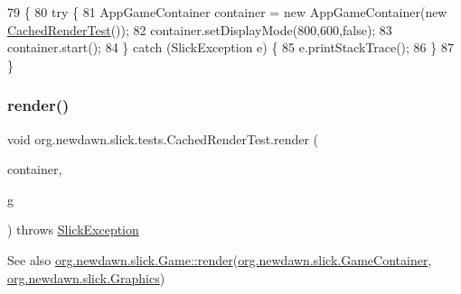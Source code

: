\begin{DoxyCode}
79                                            \{
80         \textcolor{keywordflow}{try} \{
81             AppGameContainer container = \textcolor{keyword}{new} AppGameContainer(\textcolor{keyword}{new} 
      \mbox{\hyperlink{classorg_1_1newdawn_1_1slick_1_1tests_1_1_cached_render_test_aec210751ba11df5b8061d362723f21f0}{CachedRenderTest}}());
82             container.setDisplayMode(800,600,\textcolor{keyword}{false});
83             container.start();
84         \} \textcolor{keywordflow}{catch} (SlickException e) \{
85             e.printStackTrace();
86         \}
87     \}
\end{DoxyCode}
\mbox{\label{classorg_1_1newdawn_1_1slick_1_1tests_1_1_cached_render_test_a9314cb710b62c992d698e1f15337f3d7}} 
\subsubsection{\texorpdfstring{render()}{render()}}
{\footnotesize\ttfamily void org.\+newdawn.\+slick.\+tests.\+Cached\+Render\+Test.\+render (\begin{DoxyParamCaption}\item[{\mbox{\hyperlink{classorg_1_1newdawn_1_1slick_1_1_game_container}{Game\+Container}}}]{container,  }\item[{\mbox{\hyperlink{classorg_1_1newdawn_1_1slick_1_1_graphics}{Graphics}}}]{g }\end{DoxyParamCaption}) throws \mbox{\hyperlink{classorg_1_1newdawn_1_1slick_1_1_slick_exception}{Slick\+Exception}}\hspace{0.3cm}{\ttfamily [inline]}}

\begin{DoxySeeAlso}{See also}
\mbox{\hyperlink{interfaceorg_1_1newdawn_1_1slick_1_1_game_af1a4670d43eb3ba04dfcf55ab1975b64}{org.\+newdawn.\+slick.\+Game\+::render}}(\mbox{\hyperlink{classorg_1_1newdawn_1_1slick_1_1_game_container}{org.\+newdawn.\+slick.\+Game\+Container}}, \mbox{\hyperlink{classorg_1_1newdawn_1_1slick_1_1_graphics}{org.\+newdawn.\+slick.\+Graphics}}) 
\end{DoxySeeAlso}


